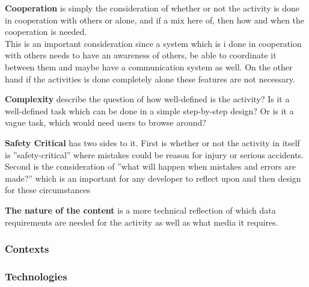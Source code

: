 \textbf{Cooperation} is simply the consideration of whether or not the activity is done in cooperation with others or alone, and if a mix here of, then how and when the cooperation is needed.
\\\indent
This is an important consideration since a system which is i done in cooperation with others needs to have an awareness of others, be able to coordinate it between them and maybe have a communication system as well.
On the other hand if the activities is done completely alone these features are not necessary. 

\textbf{Complexity} describe the question of how well-defined is the activity?
Is it a well-defined task which can be done in a simple step-by-step design?
Or is it a vague task, which would need users to browse around?

\textbf{Safety Critical} has two sides to it.
First is whether or not the activity in itself is ''safety-critical'' where mistakes could be reason for injury or serious accidents.
Second is the consideration of ''what will happen when mistakes and errors are made?'' which is an important for any developer to reflect upon and then design for these circumstances

\textbf{The nature of the content} is a more technical reflection of which data requirements are needed for the activity as well as what media it requires.

\subsubsection{Contexts}


\subsubsection{Technologies}






































